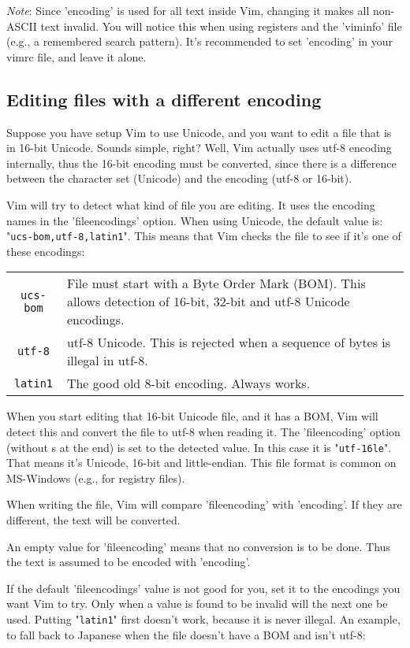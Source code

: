 \emph{Note}:
Since 'encoding' is used for all text inside Vim, changing it makes all non-ASCII text invalid.
You will notice this when using registers and the 'viminfo' file (e.g., a remembered search pattern).
It's recommended to set 'encoding' in your vimrc file, and leave it alone.
\subsection{Editing files with a different encoding}
Suppose you have setup Vim to use Unicode, and you want to edit a file that is in 16-bit Unicode.
Sounds simple, right?  Well, Vim actually uses utf-8 encoding internally, thus the 16-bit encoding must be converted, since there is a difference between the character set (Unicode) and the encoding (utf-8 or 16-bit).

Vim will try to detect what kind of file you are editing.
It uses the encoding names in the 'fileencodings' option.
When using Unicode, the default value is: "\verb!ucs-bom,utf-8,latin1!".
This means that Vim checks the file to see if it's one of these encodings:

\begin{center} \begin{tabularx}{\textwidth}{c X}
				\texttt{ucs-bom} & File must start with a Byte Order Mark (BOM).  This allows detection of 16-bit, 32-bit and utf-8 Unicode encodings. \\
				\texttt{utf-8} & utf-8 Unicode.  This is rejected when a sequence of bytes is illegal in utf-8. \\
				\texttt{latin1} & The good old 8-bit encoding.  Always works. \\
\end{tabularx} \end{center}
When you start editing that 16-bit Unicode file, and it has a BOM, Vim will detect this and convert the file to utf-8 when reading it.
The 'fileencoding' option (without s at the end) is set to the detected value.
In this case it is "\verb!utf-16le!".
That means it's Unicode, 16-bit and little-endian.
This file format is common on MS-Windows (e.g., for registry files).

When writing the file, Vim will compare 'fileencoding' with 'encoding'.
If they are different, the text will be converted.

An empty value for 'fileencoding' means that no conversion is to be done.
Thus the text is assumed to be encoded with 'encoding'.

If the default 'fileencodings' value is not good for you, set it to the encodings you want Vim to try.
Only when a value is found to be invalid will the next one be used.
Putting "\verb!latin1!" first doesn't work, because it is never illegal.
An example, to fall back to Japanese when the file doesn't have a BOM and isn't utf-8:


